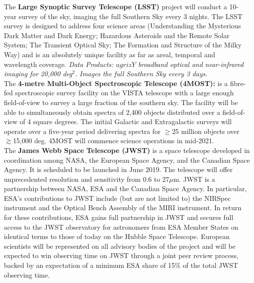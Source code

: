 \begin{framed}
The {\bf Large Synoptic Survey Telescope (LSST)} project will conduct
a 10-year survey of the sky, imaging the full Southern Sky every 3
nights. The LSST survey is designed to address four science areas
(Understanding the Mysterious Dark Matter and Dark Energy; Hazardous
Asteroids and the Remote Solar System; The Transient Optical Sky; The
Formation and Structure of the Milky Way) and is an absolutely unique
facility as far as areal, temporal and wavelength coverage.  {\it Data
Products: $ugrizY$ broadband optical and near-infrared imaging for
20,000 deg$^2$.  Images the full Southern Sky every 3 days.} \\

The {\bf 4-metre Multi-Object Spectroscopic Telescope (4MOST):} is a
fibre-fed spectroscopic survey facility on the VISTA telescope with a
large enough field-of-view to survey a large fraction of the southern
sky. The facility will be able to simultaneously obtain spectra of
2,400 objects distributed over a field-of-view of 4 square degrees.
The initial Galactic and Extragalactic surveys will operate over a
five-year period delivering spectra for $\geq$25 million objects over
$\gtrsim$15,000 deg. 4MOST will commence science operations in
mid-2021. \\ 

The {\bf James Webb Space Telescope (JWST)} is a space telescope
developed in coordination among NASA, the European Space Agency, and
the Canadian Space Agency. It is scheduled to be launched in June
2019. The telescope will offer unprecedented resolution and
sensitivity from 0.6 to 27$\mu$m.
JWST is a partnership between NASA, ESA and the Canadian Space Agency.
In particular, ESA's contributions to JWST include (but are not
limited to) the NIRSpec instrument and the Optical Bench Assembly of
the MIRI instrument.  In return for these contributions, ESA gains
full partnership in JWST and secures full access to the JWST
observatory for astronomers from ESA Member States on identical terms
to those of today on the Hubble Space Telescope. European scientists
will be represented on all advisory bodies of the project and will be
expected to win observing time on JWST through a joint peer review
process, backed by an expectation of a minimum ESA share of 15\% of
the total JWST observing time. \\


\end{framed}
